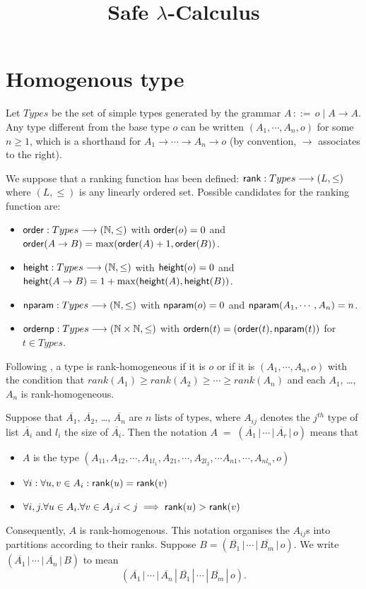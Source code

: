 \documentclass{article}
\title{Safe $\lambda$-Calculus}
\newcommand{\funsp}{\rightarrow}
\theoremstyle{definition}
\theoremstyle{remark}
\def\funto{\longrightarrow}
\newcommand\rank[1]{{\sf rank}(#1)}
\newcommand\order[1]{{\sf order}(#1)}
\newcommand\height[1]{{\sf height}(#1)}
\newcommand\nparam[1]{{\sf nparam}(#1)}
\def\nat{\mathbb{N}}
\begin{document}
\maketitle

\section{Homogenous type}

Let $Types$ be the set of simple types generated by the grammar $A
\, ::= \, o \; | \; A \funsp A$. Any type different from the base
type $o$ can be written $(A_1, \cdots, A_n, o)$ for some $n \geq 1$,
which is a shorthand for $A_1 \funsp \cdots \funsp A_n \funsp o$ (by
convention, $\rightarrow$ associates to the right).

We suppose that a ranking function has been defined: ${\sf rank} :
Types \funto (L, \leq)$ where $(L, \leq)$ is any linearly ordered
set. Possible candidates for the ranking function are:
\begin{itemize}
\item ${\sf order} : Types \funto (\nat,\leq)$ with $\order{o} = 0$
and $\order{A \funsp B} = \max(\order{A}+1, \order{B})$.
\item ${\sf height} : Types \funto (\nat,\leq)$ with $\height{o} = 0$
and $\height{A \funsp B} = 1 + \max(\height{A}, \height{B})$.
\item ${\sf nparam} : Types \funto (\nat,\leq)$ with $\nparam{o} = 0$
and $\nparam{A_1, \cdots, A_n} = n$.
\item ${\sf ordernp} : Types \funto (\nat \times \nat,\leq)$ with $ {\sf ordern} (t)  = (\order{t}, \nparam{t})$ for $t \in Types$.
\end{itemize}


Following \cite{KNU02}, a type is rank-homogeneous if it is $o$ or
if it is $(A_1, \cdots, A_n, o)$ with the condition that $rank(A_1)
\geq rank(A_2)\geq \cdots \geq rank(A_n)$ and each $A_1$, \ldots,
$A_n$ is rank-homogeneous.



Suppose that $\overline{A_1}$, $\overline{A_2}$, \ldots,
$\overline{A_n}$ are $n$ lists of types, where $A_{ij}$ denotes the
$j^{th}$ type of list $\overline{A_i}$ and $l_i$ the size of
$\overline{A_i}$. Then the notation $A \; = \; (\overline{A_1} \, |
\, \cdots \, | \, \overline{A_r} \, | \, o)$ means that
\begin{itemize}
  \item $A$ is the type $(A_{11},A_{12},\cdots, A_{1l_1}, A_{21}, \cdots,A_{2l_2}, \cdots A_{n1},\cdots, A_{nl_n},o)$
  \item $\forall i: \forall u,v \in A_i : \rank u = \rank v $
  \item $\forall i,j . \forall u \in A_i . \forall v \in A_j . i<j \implies \rank u >
   \rank v $
\end{itemize}
Consequently, $A$ is rank-homogenous. This notation organises the
$A_{ij}$s into partitions according to their ranks. Suppose $B =
(\overline{B_1} \, | \, \cdots \, | \, \overline{B_m} \, | \, o)$.
We write $(\overline{A_1} \, | \, \cdots \, | \, \overline{A_n} \, |
\, {B})$ to mean
\[(\overline{A_1} \, | \, \cdots \, | \, \overline{A_n} \, | \,
\overline{B_1} \, | \, \cdots \, | \, \overline{B_m} \, | \, o).\]
\end{document}
